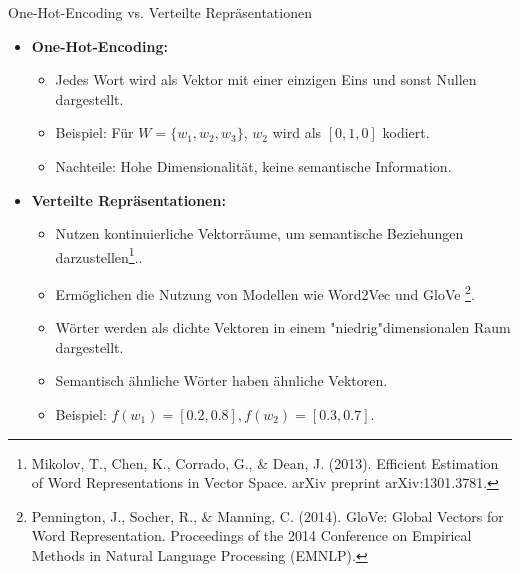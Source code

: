 \documentclass[aspectratio=1610, xcolor=dvipsnames, 9pt]{beamer}
\begin{document}
\begin{frame}{One-Hot-Encoding vs. Verteilte Repräsentationen}
  \begin{itemize}
    \item \textbf{One-Hot-Encoding:}
      \begin{itemize}
        \item Jedes Wort wird als Vektor mit einer einzigen Eins und sonst Nullen dargestellt.
        \item Beispiel: Für \( W = \{w_1, w_2, w_3\} \), \( w_2 \) wird als \( [0, 1, 0] \) kodiert.
        \item Nachteile: Hohe Dimensionalität, keine semantische Information.
      \end{itemize}
    \item \textbf{Verteilte Repräsentationen:}
      \begin{itemize}
        \item Nutzen kontinuierliche Vektorräume, um semantische Beziehungen darzustellen\footnote{Mikolov, T., Chen, K., Corrado, G., \& Dean, J. (2013). Efficient Estimation of Word Representations in Vector Space. arXiv preprint arXiv:1301.3781.}..
        \item Ermöglichen die Nutzung von Modellen wie Word2Vec und GloVe
        \footnote{Pennington, J., Socher, R., \& Manning, C. (2014). GloVe: Global Vectors for Word Representation. Proceedings of the 2014 Conference on Empirical Methods in Natural Language Processing (EMNLP).}.
        \item Wörter werden als dichte Vektoren in einem "niedrig"dimensionalen Raum dargestellt.
        \item Semantisch ähnliche Wörter haben ähnliche Vektoren.
        \item Beispiel: \( f(w_1) = [0.2, 0.8], f(w_2) = [0.3, 0.7] \).
      \end{itemize}
  \end{itemize}
\end{frame}
\end{document}
